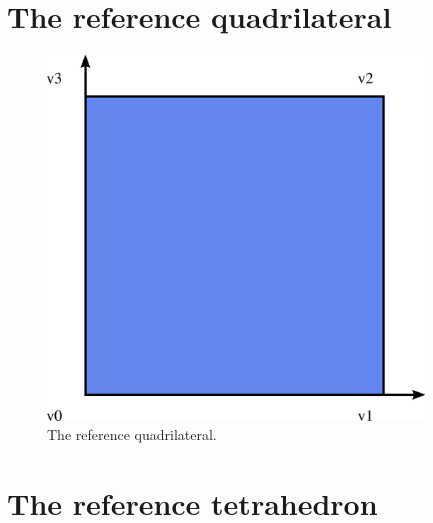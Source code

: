 \newpage
\section{The reference quadrilateral}

\begin{figure}[H]
  \begin{center}
    \includegraphics[width=10cm]{eps/quadrilateral.eps}
    \caption{The reference quadrilateral.}
  \end{center}
\end{figure}

\newpage
\section{The reference tetrahedron}

